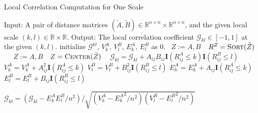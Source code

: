 \documentclass[11pt]{article}
\providecommand{\mb}[1]{\boldsymbol{#1}}
\newcommand{\Real}{\mathbb{R}}
\newcommand{\G}{\mathcal{G}}
\newcommand{\Linefor}[2]{%
    \State \algorithmicfor\ {#1}\ \algorithmicdo\ {#2} \algorithmicend\ \algorithmicfor%
}
\begin{document}
\begin{algorithm}
\caption{Local Correlation Computation for One Scale}
\label{alg1}
\begin{algorithmic}[1]
\Statex Input: A pair of distance matrices $(\tilde{A},\tilde{B}) \in \Real^{n \times n} \times \Real^{n \times n}$, and the given local scale $(k,l) \in \Real \times \Real$.
\Statex Output: The local correlation coefficient $\G_{kl} \in [-1,1]$ at the given $(k,l)$.
\State initialize $\G^{kl}$, $V^{A}_{k}$, $V^{B}_{l}$, $E^{A}_{k}$, $E^{B}_{l}$ as $0$.
\Linefor{$Z:=A,B$}{$R^{Z}=\textsc{Sort}(\tilde{Z})$} 
\Linefor{$Z:=A,B$}{$Z=\textsc{Center}(\tilde{Z})$} 
\State $\G_{kl}=\G_{kl}+A_{ij}B_{ij}\mb{I}(R^{A}_{ij} \leq k)\mb{I}(R^{B}_{ij} \leq l)$ 
\State $V^{A}_{k}=V^{A}_{k}+A_{ij}^2\mb{I}(R^{A}_{ij} \leq k)$ 
\State $V^{B}_{l}=V^{B}_{l}+B_{ij}^2\mb{I}(R^{B}_{ij} \leq l)$ 
\State $E^{A}_{k}=E^{A}_{k}+A_{ij}\mb{I}(R^{A}_{ij} \leq k)$ 
\State $E^{B}_{l}=E^{B}_{l}+B_{ij}\mb{I}(R^{B}_{ij} \leq l)$
\EndFor

\State $\G_{kl}=\left(\G_{kl}-E^{A}_{k}E^{B}_{l}/n^2\right)/\sqrt{\left(V^{A}_{k}-{E^{A}_{k}}^2/n^2\right) \left(V^{B}_{l}-{E^{B}_{l}}^2/n^2\right)}$ 

\EndFunction
\end{algorithmic}
\end{algorithm}
\end{document}
